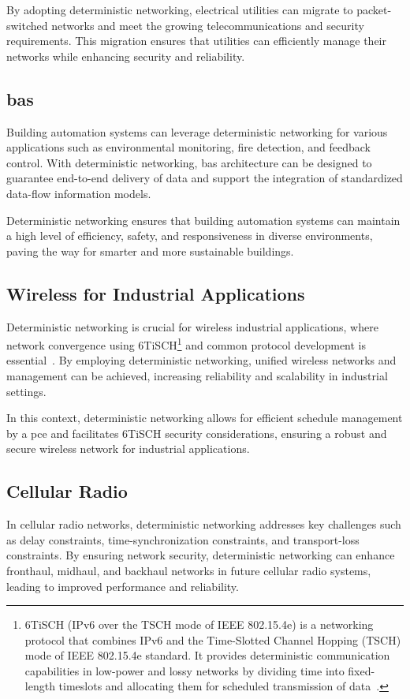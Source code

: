 \documentclass[runningheads]{llncs}
\begin{document}
By adopting deterministic networking, electrical utilities can migrate to packet-switched networks and meet the growing telecommunications and security requirements. This migration ensures that utilities can efficiently manage their networks while enhancing security and reliability.

\subsection{\gls{bas}}
Building automation systems can leverage deterministic networking for various applications such as environmental monitoring, fire detection, and feedback control. With deterministic networking, \gls{bas} architecture can be designed to guarantee end-to-end delivery of data and support the integration of standardized data-flow information models.

Deterministic networking ensures that building automation systems can maintain a high level of efficiency, safety, and responsiveness in diverse environments, paving the way for smarter and more sustainable buildings.

\subsection{Wireless for Industrial Applications}
Deterministic networking is crucial for wireless industrial applications, where network convergence using 6TiSCH\footnote{6TiSCH (IPv6 over the TSCH mode of IEEE 802.15.4e) is a networking protocol that combines IPv6 and the Time-Slotted Channel Hopping (TSCH) mode of IEEE 802.15.4e standard. It provides deterministic communication capabilities in low-power and lossy networks by dividing time into fixed-length timeslots and allocating them for scheduled transmission of data~\cite{Vilajosana2020,Dujovne2014}.} and common protocol development is essential~\cite{rfc9023}. By employing deterministic networking, unified wireless networks and management can be achieved, increasing reliability and scalability in industrial settings.

In this context, deterministic networking allows for efficient schedule management by a \gls{pce} and facilitates 6TiSCH security considerations, ensuring a robust and secure wireless network for industrial applications.

\subsection{Cellular Radio}
In cellular radio networks, deterministic networking addresses key challenges such as delay constraints, time-synchronization constraints, and transport-loss constraints. By ensuring network security, deterministic networking can enhance fronthaul, midhaul, and backhaul networks in future cellular radio systems, leading to improved performance and reliability.
\end{document}
